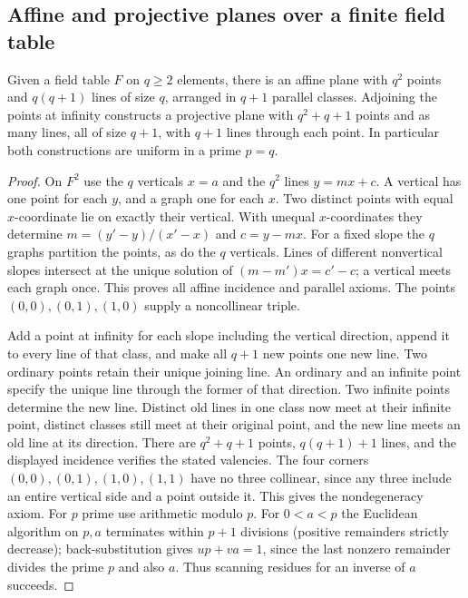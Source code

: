 \subsection{Affine and projective planes over a finite field table}

\begin{theorem}\label{result46}
Given a field table \(F\) on \(q\ge2\) elements, there is an affine plane
with \(q^2\) points and \(q(q+1)\) lines of size \(q\), arranged in
\(q+1\) parallel classes. Adjoining the points at infinity constructs a
projective plane with \(q^2+q+1\) points and as many lines, all of size
\(q+1\), with \(q+1\) lines through each point. In particular both
constructions are uniform in a prime \(p=q\).
\end{theorem}
\begin{proof}
On \(F^2\) use the \(q\) verticals \(x=a\) and the \(q^2\) lines
\(y=mx+c\). A vertical has one point for each \(y\), and a graph
one for each \(x\). Two distinct points with equal \(x\)-coordinate
lie on exactly their vertical. With unequal \(x\)-coordinates they determine
\(m=(y'-y)/(x'-x)\) and \(c=y-mx\). For a fixed slope the \(q\) graphs
partition the points, as do the \(q\) verticals. Lines of different
nonvertical slopes intersect at the unique solution of
\((m-m')x=c'-c\); a vertical meets each graph once. This proves all
affine incidence and parallel axioms. The points \((0,0),(0,1),(1,0)\)
supply a noncollinear triple.

Add a point at infinity for each slope including the vertical direction,
append it to every line of that class, and make all \(q+1\) new points
one new line. Two ordinary points retain their unique joining line.
An ordinary and an infinite point specify the unique line through
the former of that direction. Two infinite points determine the new
line. Distinct old lines in one class now meet at their infinite point,
distinct classes still meet at their original point, and the new line
meets an old line at its direction. There are \(q^2+q+1\) points,
\(q(q+1)+1\) lines, and the displayed incidence verifies the stated
valencies. The four corners \((0,0),(0,1),(1,0),(1,1)\) have no
three collinear, since any three include an entire vertical side and a
point outside it. This gives the nondegeneracy axiom. For \(p\) prime
use arithmetic modulo \(p\). For \(0<a<p\) the Euclidean algorithm
on \(p,a\) terminates within \(p+1\) divisions (positive remainders
strictly decrease); back-substitution gives \(up+va=1\), since the
last nonzero remainder divides the prime \(p\) and also \(a\).
Thus scanning residues for an inverse of \(a\) succeeds.
\end{proof}

